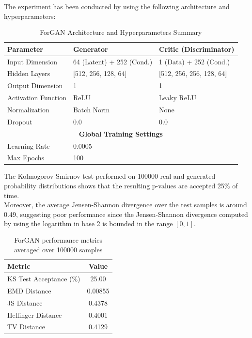 The experiment has been conducted by using the following architecture and hyperparameters:
\begin{table}[H]
\centering
\caption{ForGAN Architecture and Hyperparameters Summary}
\label{tab:forgan_summary}
\begin{tabular}{lll}
\hline
\textbf{Parameter}         & \textbf{Generator}          & \textbf{Critic (Discriminator)} \\ \hline
Input Dimension            & 64 (Latent) + 252 (Cond.)   & 1 (Data) + 252 (Cond.)          \\
Hidden Layers              & [512, 256, 128, 64]         & [512, 256, 256, 128, 64]        \\
Output Dimension           & 1                           & 1                               \\
Activation Function        & ReLU                        & Leaky ReLU                      \\
Normalization              & Batch Norm                  & None                      \\
Dropout                    & 0.0                         & 0.0                             \\
\multicolumn{3}{c}{\textbf{Global Training Settings}}                                     \\ \hline
Learning Rate              & \multicolumn{2}{l}{0.0005}                                      \\
Max Epochs                 & \multicolumn{2}{l}{100}                                       \\
\end{tabular}
\end{table}

The Kolmogorov-Smirnov test performed on 100000 real and generated probability distributions shows that
the resulting p-values are accepted 25\% of time.\\
Moreover, the average Jensen-Shannon divergence over the test samples is around 0.49,
suggesting poor performance since the Jensen-Shannon divergence computed by using the logarithm in base 2
is bounded in the range $[0, 1]$.

\begin{table}[h]
\centering
\begin{tabular}{l c}
\hline
\textbf{Metric} & \textbf{Value} \\
\hline
KS Test Acceptance (\%) & 25.00 \\
EMD Distance & 0.00855 \\
JS Distance & 0.4378 \\
Hellinger Distance & 0.4001 \\
TV Distance & 0.4129 \\
\hline
\end{tabular}
\caption{ForGAN performance metrics averaged over 100000 samples}
\end{table}

